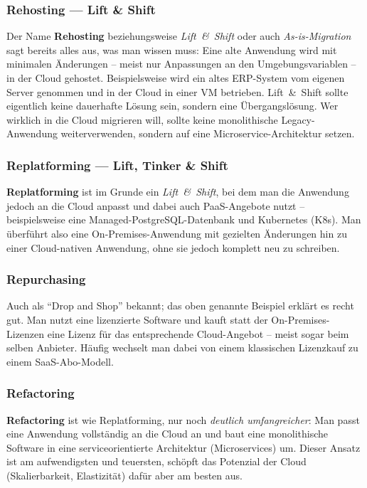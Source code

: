 \subsubsection{Rehosting — Lift \& Shift}
Der Name \textbf{Rehosting} beziehungsweise \textit{Lift~\&~Shift} oder auch \textit{As-is-Migration} sagt bereits alles aus, was man wissen muss: Eine alte Anwendung wird mit minimalen Änderungen -- meist nur Anpassungen an den Umgebungsvariablen -- in der Cloud gehostet. Beispielsweise wird ein altes ERP-System vom eigenen Server genommen und in der Cloud in einer VM betrieben. Lift~\&~Shift sollte eigentlich keine dauerhafte Lösung sein, sondern eine Übergangslösung. Wer wirklich in die Cloud migrieren will, sollte keine monolithische Legacy-Anwendung weiterverwenden, sondern auf eine Microservice-Architektur setzen.

\subsubsection{Replatforming — Lift, Tinker \& Shift}
\textbf{Replatforming} ist im Grunde ein \textit{Lift~\&~Shift}, bei dem man die Anwendung jedoch an die Cloud anpasst und dabei auch PaaS-Angebote nutzt -- beispielsweise eine Managed-PostgreSQL-Datenbank und Kubernetes (K8s). Man überführt also eine On-Premises-Anwendung mit gezielten Änderungen hin zu einer Cloud-nativen Anwendung, ohne sie jedoch komplett neu zu schreiben.

\subsubsection{Repurchasing}
Auch als \enquote{Drop and Shop} bekannt; das oben genannte Beispiel erklärt es recht gut. Man nutzt eine lizenzierte Software und kauft statt der On-Premises-Lizenzen eine Lizenz für das entsprechende Cloud-Angebot -- meist sogar beim selben Anbieter. Häufig wechselt man dabei von einem klassischen Lizenzkauf zu einem SaaS-Abo-Modell.

\subsubsection{Refactoring}
\textbf{Refactoring} ist wie Replatforming, nur noch \emph{deutlich umfangreicher}: Man passt eine Anwendung vollständig an die Cloud an und baut eine monolithische Software in eine serviceorientierte Architektur (Microservices) um. Dieser Ansatz ist am aufwendigsten und teuersten, schöpft das Potenzial der Cloud (Skalierbarkeit, Elastizität) dafür aber am besten aus.

